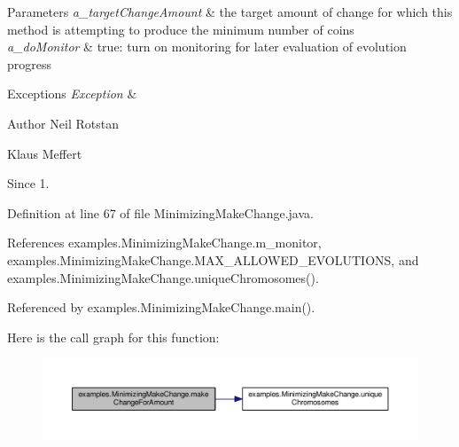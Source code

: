 \begin{DoxyParams}{Parameters}
{\em a\-\_\-target\-Change\-Amount} & the target amount of change for which this method is attempting to produce the minimum number of coins \\
\hline
{\em a\-\_\-do\-Monitor} & true\-: turn on monitoring for later evaluation of evolution progress\\
\hline
\end{DoxyParams}

\begin{DoxyExceptions}{Exceptions}
{\em Exception} & \\
\hline
\end{DoxyExceptions}
\begin{DoxyAuthor}{Author}
Neil Rotstan 

Klaus Meffert 
\end{DoxyAuthor}
\begin{DoxySince}{Since}
1. 
\end{DoxySince}


Definition at line 67 of file Minimizing\-Make\-Change.\-java.



References examples.\-Minimizing\-Make\-Change.\-m\-\_\-monitor, examples.\-Minimizing\-Make\-Change.\-M\-A\-X\-\_\-\-A\-L\-L\-O\-W\-E\-D\-\_\-\-E\-V\-O\-L\-U\-T\-I\-O\-N\-S, and examples.\-Minimizing\-Make\-Change.\-unique\-Chromosomes().



Referenced by examples.\-Minimizing\-Make\-Change.\-main().



Here is the call graph for this function\-:
\nopagebreak
\begin{figure}[H]
\begin{center}
\leavevmode
\includegraphics[width=350pt]{classexamples_1_1_minimizing_make_change_afdb27e2502d878504a6fc01d09c2e46f_cgraph}
\end{center}
\end{figure}


